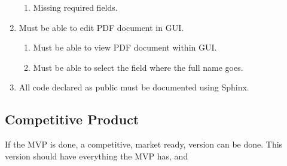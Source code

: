 \documentclass[11pt]{article}
\begin{document}
\begin{enumerate}
\begin{enumerate}
        \item Missing required fields.
    \end{enumerate}
    \item Must be able to edit PDF document in GUI.
    \begin{enumerate}
        \item Must be able to view PDF document within GUI.
        \item Must be able to select the field where the full name goes.
    \end{enumerate}
    \item All code declared as public must be documented using Sphinx.
\end{enumerate}

\subsection{Competitive Product}

If the MVP is done, a competitive, market ready, version can be done. This version should have everything the MVP has, and
\end{document}

